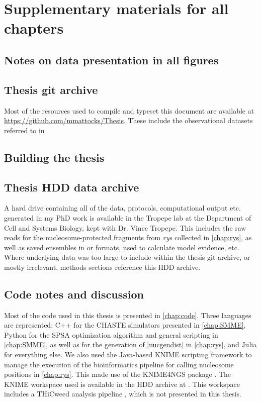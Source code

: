 \chapter{Supplementary materials for all chapters}
\label{chap:allsup}
\section{Notes on data presentation in all figures}


\section{Thesis git archive}
Most of the resources used to compile and typeset this document are available at \url{https://github.com/mmattocks/Thesis}. These include the observational datasets referred to in

\section{Building the thesis}

\section{Thesis HDD data archive}
\label{sec:archive}
A hard drive containing all of the data, protocols, computational output etc. generated in my PhD work is available in the Tropepe lab at the Department of Cell and Systems Biology, kept with Dr. Vince Tropepe. This includes the raw reads for the nucleosome-protected fragments from \textit{rys} collected in \autoref{chap:rys}, as well as saved ensembles in  or  formats, used to calculate model evidence, etc. Where underlying data was too large to include within the thesis git archive, or mostly irrelevant, methods sections reference this HDD archive. 

\section{Code notes and discussion}
Most of the code used in this thesis is presented in \autoref{chap:code}. Three languages are represented: C++ for the CHASTE simulators presented in \autoref{chap:SMME}, Python for the SPSA optimization algorithm and general scripting in \autoref{chap:SMME}, as well as for the generation of \autoref{nucgendist} in \autoref{chap:rys}, and Julia for everything else. We also used the Java-based KNIME scripting framework to manage the execution of the bioinformatics pipeline for calling nucleosome positions in \autoref{chap:rys}. This made use of the KNIME4NGS package \cite{Hastreiter2017}. The KNIME workspace used is available in the HDD archive at . This workspace includes a THiCweed analysis pipeline \cite{Agrawal2017}, which is not presented in this thesis.

